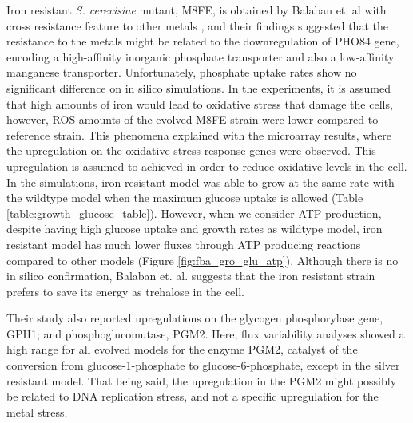 Iron resistant \emph{S. cerevisiae} mutant, M8FE, is obtained by Balaban et. al with cross resistance feature to other metals \cite{balaban2020evolutionary}, and their findings suggested that the resistance to the metals might be related to the downregulation of PHO84 gene, encoding a high-affinity inorganic phosphate transporter and also a low-affinity manganese transporter. Unfortunately, phosphate uptake rates show no significant difference on in silico simulations. In the experiments, it is assumed that high amounts of iron would lead to oxidative stress that damage the cells, however, ROS amounts of the evolved M8FE strain were lower compared to reference strain. This phenomena explained with the microarray results, where the upregulation on the oxidative stress response genes were observed. This upregulation is assumed to achieved in order to reduce oxidative levels in the cell. In the simulations, iron resistant model was able to grow at the same rate with the wildtype model when the maximum glucose uptake is allowed (Table \ref{table:growth_glucose_table}). However, when we consider ATP production, despite having high glucose uptake and growth rates as wildtype model, iron resistant model has much lower fluxes through ATP producing reactions compared to other models (Figure \ref{fig:fba_gro_glu_atp}). Although there is no in silico confirmation, Balaban et. al. suggests that the iron resistant strain prefers to save its energy as trehalose in the cell.

Their study also reported upregulations on the glycogen phosphorylase gene, GPH1; and phosphoglucomutase, PGM2. Here, flux variability analyses showed a high range for all evolved models for the enzyme PGM2, catalyst of the conversion from glucose-1-phosphate to glucose-6-phosphate, except in the silver resistant model. That being said, the upregulation in the PGM2 might possibly be related to DNA replication stress, and not a specific upregulation for the metal stress.



